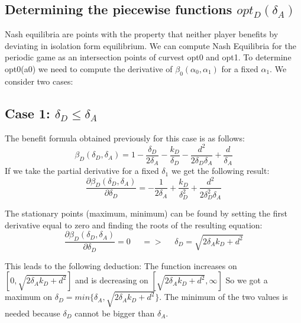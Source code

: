 \subsection{Determining the piecewise functions $opt_{D}(\delta_{A})$}

Nash equilibria are points with the property that neither player benefits by deviating in isolation form equilibrium. We can compute Nash Equilibria for the periodic game as an intersection points of curvest opt0 and opt1. To determine opt0(a0) we need to compute the derivative of  $\beta_{0}(\alpha_{0},\alpha_{1}) $ for a fixed $\alpha_{1}$. We consider two cases:\\

\subsection*{Case 1: $\delta_{D} \leq \delta_{A} $}
The benefit formula obtained previously for this case is as follows:
\begin{equation*}
\beta_{D}(\delta_{D},\delta_{A}) = 1 - \dfrac{\delta_{D}}{2\delta_{A}} - \dfrac{k_{D}}{\delta_{D}} - \dfrac{d^{2}}{2\delta_{D}\delta_{A}} + \dfrac{d}{\delta_{A}}
\end{equation*}
If we take the partial derivative for a fixed $\delta_{1}$ we get the following result:
\begin{equation*}\label{formdelta}
\frac{\partial \beta_{D}(\delta_{D},\delta_{A})}{\partial \delta_{D}} = - \dfrac{1}{2\delta_{A}} + \dfrac{k_{D}}{\delta_{D}^{2}} + \dfrac{d^{2}}{2\delta_{D}^{2}\delta_{A}}
\end{equation*}

The stationary points (maximum, minimum) can be found by setting the first derivative equal to zero and finding the roots of the resulting equation:
\begin{equation*}
\frac{\partial \beta_{D}(\delta_{D},\delta_{A})}{\partial \delta_{D}} =0 ~~~~~~ =>~~~~~~ \delta_{D} = \sqrt{2\delta_{A}k_{D} + d^{2}}
\end{equation*}

This leads to the following deduction: The function increases on $[0, \sqrt{2\delta_{A}k_{D} + d^{2}}]$ and is decreasing on $[\sqrt{2\delta_{A}k_{D} + d^{2}}, \infty]$ So we got a maximum on $\delta_{D} = min \{ \delta_{A}, \sqrt{2\delta_{A}k_{D} + d^{2}} \} $. The minimum of the two values is needed because $\delta_{D}$ cannot be bigger than $\delta_{A}$. \\
~~\\


